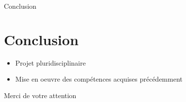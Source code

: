 \documentclass{beamer}
\begin{document}
	\begin{frame}{Conclusion}
	\section*{Conclusion}
	\begin{itemize}
		    \item Projet pluridisciplinaire
		    \item Mise en oeuvre des compétences acquises précédemment
		\end{itemize}
	\end{frame}
	\author[]{Florian POUTHIER - Tristan DRUSSEL}
	\begin{frame}[plain]{Merci de votre attention}
	\section*{}
		\titlepage
	\end{frame}
\end{document}
